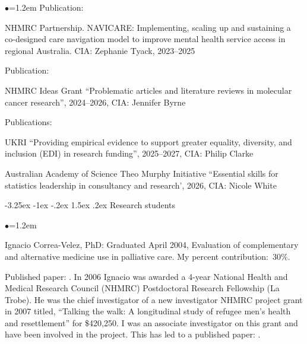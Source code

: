 \documentclass[a4paper,11pt]{article}
\makeatletter
\renewcommand\subsection{\@startsection{subsection}{2}{\z@}%
                                       {-3.25ex \@plus -1ex \@minus -.2ex}%
                                       {1.5ex \@plus .2ex}%
                                   {\normalfont\normalsize\bfseries\color{blue}}}
\renewcommand{\labelitemi}{$\bullet$}
\makeatother
\begin{document}
\begin{raggedright}
\begin{list}{\labelitemi}{\leftmargin=1.2em}
Publication: 

\item NHMRC Partnership. NAVICARE: Implementing, scaling up and sustaining a co-designed care navigation model to improve mental health service access in regional Australia. CIA: Zephanie Tyack, 2023--2025

Publication: 

\item NHMRC Ideas Grant ``Problematic articles and literature reviews in molecular cancer research'', 2024--2026, CIA: Jennifer Byrne

Publications: 

\item UKRI ``Providing empirical evidence to support greater equality, diversity, and inclusion (EDI) in research funding'', 2025--2027, CIA: Philip Clarke

\item Australian Academy of Science Theo Murphy Initiative ``Essential skills for statistics leadership in consultancy and research', 2026, CIA: Nicole White


\end{list}


\subsection{Research students}

\begin{list}{\labelitemi}{\leftmargin=1.2em}\addtolength{\itemsep}{-0.5\baselineskip}
\item Ignacio Correa-Velez, PhD: Graduated April 2004, Evaluation of complementary and alternative medicine use in palliative care. My percent contribution:~30\%.

Published paper: . In 2006 Ignacio was awarded a 4-year National Health and Medical Research Council (NHMRC) Postdoctoral Research Fellowship (La Trobe). He was the chief investigator of a new investigator NHMRC project grant in 2007 titled, ``Talking the walk: A longitudinal study of refugee men's health and resettlement'' for \$420,250. I was an associate investigator on this grant and have been involved in the project. This has led to a published paper: .


\end{list}
\end{raggedright}
\end{document}
